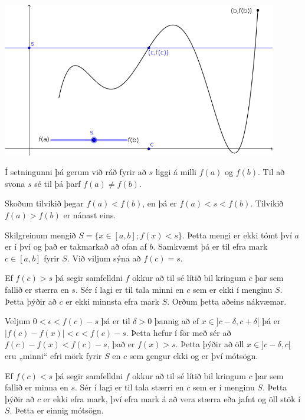 \documentclass[a4paper,10pt,icelandic]{sphinxmanual}
\begin{document}
\begin{center}
\includegraphics[width=12cm,keepaspectratio=true]{10_milligildissetn.png}
\end{center}



Í setningunni þá gerum við ráð fyrir að \(s\) liggi á milli \(f(a)\) og
\(f(b)\). Til að svona \(s\) sé til þá þarf \(f(a) \neq f(b)\).

Skoðum tilvikið þegar \(f(a) < f(b)\), en þá er \(f(a) < s < f(b)\).
Tilvikið \(f(a)>f(b)\) er nánast eins.

Skilgreinum mengið \(S = \{ x \in [a,b] ; f(x) < s\}\). Þetta mengi er ekki tómt
því \(a\) er í því og það er takmarkað að ofan af \(b\). Samkvæmt
{\hyperref[\detokenize{kafli01:frumsendanumeframark}]{}} þá er til efra mark \(c \in[a,b]\)
fyrir \(S\). Við viljum sýna að \(f(c)=s\).

Ef \(f(c)>s\) þá segir samfelldni \(f\)
okkur að til sé lítið bil kringum \(c\) þar sem fallið er stærra en \(s\). Sér í lagi er
til tala minni en \(c\) sem er ekki í menginu \(S\). Þetta þýðir að \(c\) er
ekki minnsta efra mark \(S\). Orðum þetta aðeins nákvæmar.

Veljum \(0<\epsilon < f(c)-s\) þá er til \(\delta>0\) þannig að ef \(x\in ]c-\delta,c+\delta[\)
þá er \(|f(c)-f(x)|<\epsilon < f(c) -s\). Þetta hefur í för með sér að \(f(c) - f(x) < f(c) -s\),
það er \(f(x)>s\). Þetta þýðir að öll \(x\in]c-\delta,c[\) eru „minni“ efri mörk fyrir \(S\)
en \(c\) sem gengur ekki og er því mótsögn.

Ef \(f(c)<s\) þá segir samfelldni \(f\) okkur að til sé lítið bil kringum \(c\)
þar sem fallið er minna en \(s\). Sér í lagi  er til tala stærri en \(c\) sem er í menginu
\(S\). Þetta þýðir að \(c\) er ekki efra mark, því efra mark á að vera stærra eða jafnt
og öll stök í \(S\). Þetta er einnig mótsögn.
\end{document}
